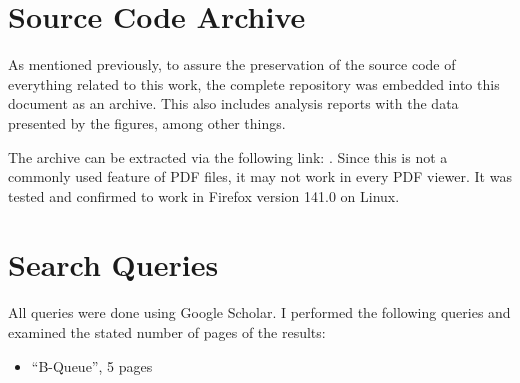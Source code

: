 \chapter{Source Code Archive}
\label{app:source-code-archive}
As mentioned previously, to assure the preservation of the source code of everything related to this work,
the complete repository was embedded into this document as an archive.
This also includes analysis reports with the data presented by the figures, among other things.

The archive can be extracted via the following link: .
Since this is not a commonly used feature of PDF files, it may not work in every PDF viewer.
It was tested and confirmed to work in Firefox version 141.0 on Linux.

\chapter{Search Queries}
\label{app:repro-search-queries}
All queries were done using Google Scholar.
I performed the following queries and examined the stated number of pages of the results:
\begin{itemize}
    \item ``B-Queue'', 5 pages
\end{itemize}




\printglossary[type=\acronymtype]

{
    \listoffigures

    \let\clearpage\relax
    \let\cleardoublepage\relax

    \listoflistings
}
